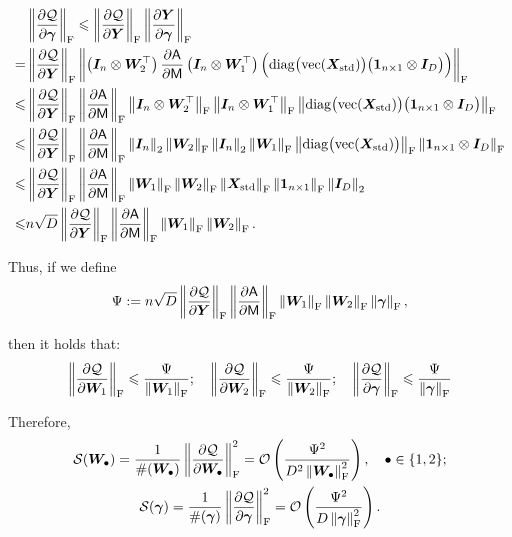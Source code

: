 \begin{align*}
    &\norm{\frac{\partial \cQ}{\partial\bgamma}}_\rF
    \leq\norm{\frac{\partial \cQ}{\partial\bY}}_\rF\norm{\frac{\partial \bY}{\partial\bgamma}}_\rF
    \\=&\norm{\frac{\partial \cQ}{\partial\bY}}_\rF\norm{\left(\bI_{n}\otimes\bW_2^\top\right)\frac{\partial\ASA}{\partial\MSA}\left(\bI_n\otimes\bW_1^\top\right)\Big(\diag\big(\vec(\bX_{\rm std})\big)\big(\bone_{n\times 1}\otimes \bI_{D}\big)\Big)}_\rF
    \\\leq&\norm{\frac{\partial \cQ}{\partial\bY}}_\rF\norm{\frac{\partial\ASA}{\partial\MSA}}_\rF\norm{\bI_{n}\otimes\bW_2^\top}_\rF\norm{\bI_{n}\otimes\bW_1^\top}_\rF\norm{\diag\big(\vec(\bX_{\rm std})\big)\big(\bone_{n\times 1}\otimes \bI_{D}\big)}_\rF
    \\\leq&
    \norm{\frac{\partial \cQ}{\partial\bY}}_\rF\norm{\frac{\partial\ASA}{\partial\MSA}}_\rF\norm{\bI_{n}}_2\norm{\bW_2}_\rF\norm{\bI_{n}}_2\norm{\bW_1}_\rF\norm{\diag\big(\vec(\bX_{\rm std})\big)}_\rF\norm{\bone_{n\times 1}\otimes \bI_{D}}_\rF
    \\\leq&
    \norm{\frac{\partial \cQ}{\partial\bY}}_\rF\norm{\frac{\partial\ASA}{\partial\MSA}}_\rF\norm{\bW_1}_\rF\norm{\bW_2}_\rF\norm{\bX_{\rm std}}_\rF\norm{\bone_{n\times 1}}_\rF\norm{\bI_{D}}_2
    \\\leq& n\sqrt{D}\norm{\frac{\partial \cQ}{\partial\bY}}_\rF\norm{\frac{\partial\ASA}{\partial\MSA}}_\rF\norm{\bW_1}_\rF\norm{\bW_2}_\rF.
\end{align*}

Thus, if we define
$$\Psi:=n\sqrt{D}\norm{\frac{\partial \cQ}{\partial\bY}}_\rF\norm{\frac{\partial\ASA}{\partial\MSA}}_\rF\norm{\bW_1}_\rF\norm{\bW_2}_\rF\norm{\bgamma}_\rF,$$

then it holds that:
\begin{gather*}
\norm{\frac{\partial \cQ}{\partial\bW_1}}_\rF\leq\frac{\Psi}{\norm{\bW_1}_{\rF}};\quad
\norm{\frac{\partial \cQ}{\partial\bW_2}}_\rF\leq\frac{\Psi}{\norm{\bW_2}_{\rF}};\quad
\norm{\frac{\partial \cQ}{\partial\bgamma}}_\rF\leq\frac{\Psi}{\norm{\bgamma}_{\rF}}
\end{gather*}

Therefore,
\begin{gather*}
    \cS(\bW_{\bullet})=\frac{1}{\#(\bW_{\bullet})}\norm{\frac{\partial \cQ}{\partial\bW_{\bullet}}}_\rF^2=\cO\left(\frac{\Psi^2}{D^2\norm{\bW_\bullet}_\rF^2}\right),\quad\bullet\in\{1,2\};
    \\
    \cS(\bgamma)=\frac{1}{\#(\bgamma)}\norm{\frac{\partial \cQ}{\partial\bgamma}}_\rF^2=\cO\left(\frac{\Psi^2}{D\norm{\bgamma}_\rF^2}\right).
\end{gather*}


